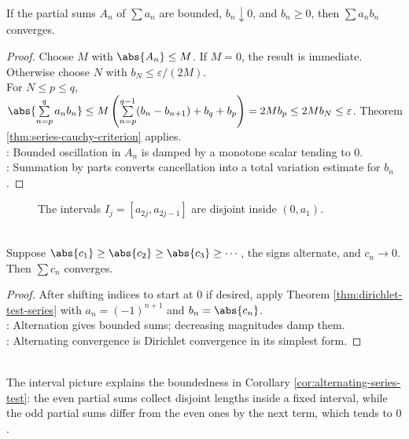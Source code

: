 \begin{theorem} \label{thm:dirichlet-test-series} \\
If the partial sums $A_n$ of $\sum a_n$ are bounded, $b_n\downarrow0$, and $b_n\geq0$, then $\sum a_nb_n$ converges.
\begin{proof}
Choose $M$ with $\abs{A_n}\leq M$. If $M=0$, the result is immediate. Otherwise choose $N$ with $b_N\leq\varepsilon/(2M)$.\\
For $N\leq p\leq q$, $\abs{\sum\limits_{n=p}^{q}a_nb_n}\leq M\left(\sum\limits_{n=p}^{q-1}(b_n-b_{n+1})+b_q+b_p\right)=2Mb_p\leq2Mb_N\leq\varepsilon$. Theorem \ref{thm:series-cauchy-criterion} applies.\\
: Bounded oscillation in $A_n$ is damped by a monotone scalar tending to $0$.\\
: Summation by parts converts cancellation into a total variation estimate for $b_n$.
\end{proof}
\end{theorem}

\begin{figure}[H]
  \centering
  
  \caption{The intervals $I_j=[a_{2j},a_{2j-1}]$ are disjoint inside $(0,a_1)$.}
  \label{fig:alternating-series-intervals}
\end{figure}

\begin{corollary} \label{cor:alternating-series-test} \\
Suppose $\abs{c_1}\geq\abs{c_2}\geq\abs{c_3}\geq\cdots$, the signs alternate, and $c_n\to0$. Then $\sum c_n$ converges.
\begin{proof}
After shifting indices to start at $0$ if desired, apply Theorem \ref{thm:dirichlet-test-series} with $a_n=(-1)^{n+1}$ and $b_n=\abs{c_n}$.\\
: Alternation gives bounded sums; decreasing magnitudes damp them.\\
: Alternating convergence is Dirichlet convergence in its simplest form.
\end{proof}
\end{corollary}

\begin{perspective} \label{per:alternating-series-interval-picture} \\
The interval picture explains the boundedness in Corollary \ref{cor:alternating-series-test}: the even partial sums collect disjoint lengths inside a fixed interval, while the odd partial sums differ from the even ones by the next term, which tends to $0$.
\end{perspective}

